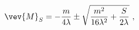 \begin{equation}
\label{vev1}
\vev{M}_S=-\frac{m}{4 \lambda}\pm \sqrt{\frac{m^2}{16 \lambda^2}+
\frac{S}{2 \lambda}} ~,
\end{equation}

